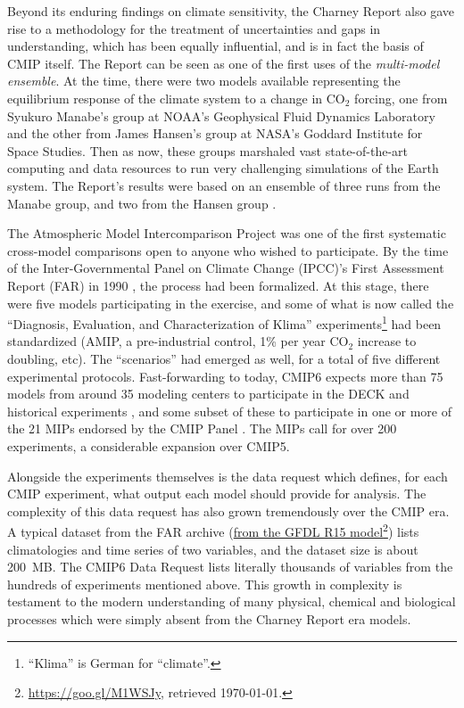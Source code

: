 \documentclass[gmd,manuscript]{copernicus}
\newcommand{\pllabel}[1]{\label{p-#1}\linelabel{l-#1}}
\newcommand{\urlref}[2] {\href{#1}{#2}\footnote{\url{#1}, retrieved \today.}}
\begin{document}
Beyond its
\pllabel{RC2-4}
enduring findings on climate sensitivity, the Charney Report also gave
rise to a methodology for the treatment of uncertainties and gaps in
understanding, which has been equally influential, and is in fact the
basis of CMIP itself. The Report can be seen as one of the first uses
of the \emph{multi-model ensemble}. At the time, there were two models
available \pllabel{RC1-3} representing the equilibrium response of the
climate system to a change in CO$_2$ forcing, one from Syukuro
Manabe's group at NOAA's Geophysical Fluid Dynamics Laboratory and
the other from James Hansen's group at NASA's Goddard Institute for
Space Studies. Then as now, these groups marshaled vast
state-of-the-art computing and data resources to run very challenging
simulations of the Earth system. The Report's results were based on an
ensemble of
\pllabel{RC2-5}
three runs from the Manabe group, \pllabel{RC1-4}  and two
from the Hansen group \pllabel{RC1-5}.

The Atmospheric Model Intercomparison Project
\citep[AMIP:][]{ref:gates1992} was one of the first systematic
cross-model comparisons open to anyone who wished to participate.
\pllabel{RC1-6}
By the time of the Inter-Governmental Panel on Climate Change (IPCC)'s
First Assessment Report (FAR) in 1990 \citep{ref:houghtonetal1992},
\pllabel{RC1-9}
the process had been formalized. At this stage, there were
\pllabel{RC2-6}
five models participating in the exercise, and some of what
\pllabel{RC2-7}
is now called the ``Diagnosis, Evaluation, and Characterization of
Klima'' \citep[DECK, see][]{ref:eyringetal2016a}
experiments\footnote{``Klima'' is German for ``climate''.} had been
standardized (AMIP, a pre-industrial control, 1\% per year CO$_2$
increase to doubling, etc). The ``scenarios'' had emerged as well, for
a total of
\pllabel{RC2-6b}
five different experimental protocols. Fast-forwarding to today, CMIP6
expects more than 75 models from around 35 modeling centers \citep[in
14 countries, a stark contrast to the US monopoly
in][]{ref:charneyetal1979} to participate in the DECK and historical
experiments \citep[Table~2 of][]{ref:eyringetal2016a}, and some subset
of these to participate in one or more of the 21 MIPs endorsed by the
CMIP Panel \citep[Table~3 of][, now 23 with two new endorsed MIPs
since]{ref:eyringetal2016a}. \pllabel{RC1-7} The MIPs call for over
200 experiments, a considerable expansion over CMIP5.

Alongside the experiments themselves is the data request which
defines, for each CMIP experiment, what output each model should
provide for analysis. The complexity of this data request has also
grown tremendously over the CMIP era. A typical dataset from the FAR
archive (\urlref{https://goo.gl/M1WSJy}{from the GFDL R15 model}) lists
climatologies and time series of two variables, and the dataset size
is about 200~MB. The CMIP6 Data Request \cite{ref:juckesetal2015}
lists literally thousands of variables from the hundreds of
experiments mentioned above. This growth in complexity is testament to
the modern understanding of many physical, chemical and biological
processes which were simply absent from the Charney Report era models.
\end{document}
